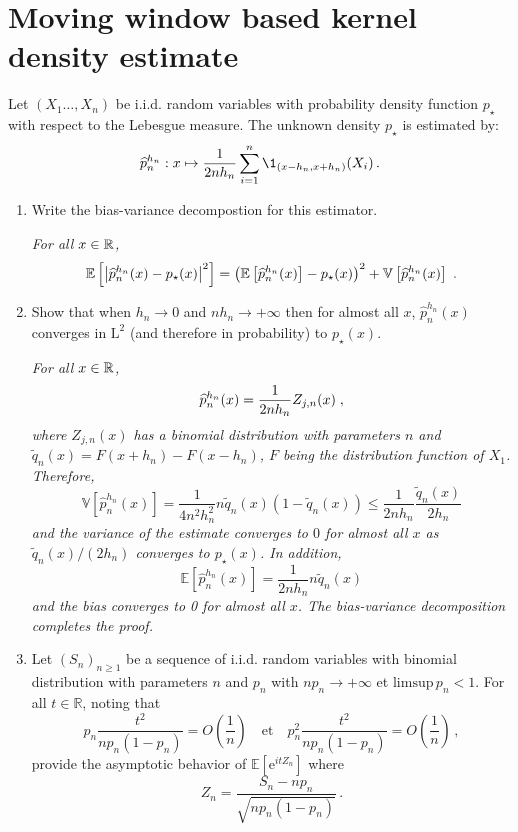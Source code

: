 \section{Moving window based kernel density estimate}
Let $(X_1\ldots,X_n)$ be i.i.d. random variables with probability density function $p_{\star}$ with respect to the Lebesgue measure. The unknown density  $p_{\star}$ is estimated by:
\[
\widehat{p}^{h_n}_n:x\mapsto \frac{1}{2nh_n}\sum_{i=1}^n \1_{(x-h_n,x+h_n)}(X_i)\,.
\]
\begin{enumerate}
\item Write the bias-variance decompostion for this estimator.

\vspace{.2cm}

{\em
For all $x\in\mathbb{R}$,
$$
\mathbb{E}\left[\left|\widehat{p}^{h_n}_n(x) - p_{\star}(x)\right|^2\right] = \left(\mathbb{E}\left[\widehat{p}^{h_n}_n(x)\right] - p_{\star}(x) \right)^2 + \mathbb{V}\left[\widehat{p}^{h_n}_n(x)\right] \;.
$$
}
\item Show that when  $h_n \to 0$ and $nh_n \to +\infty$ then for almost all $x$, $\widehat{p}^{h_n}_n(x)$ converges in $\mathrm{L}^2$ (and therefore in probability) to $p_{\star}(x)$.

\vspace{.2cm}

{\em
For all $x\in\mathbb{R}$,
$$
\widehat{p}^{h_n}_n(x) =  \frac{1}{2nh_n}Z_{j,n}(x)\;,
$$
where $Z_{j,n}(x)$ has a binomial distribution with parameters $n$ and $\tilde q_n(x) = F(x+h_n) - F(x-h_n)$, $F$ being the distribution function of $X_1$. Therefore,
$$
\mathbb{V}\left[\widehat{p}^{h_n}_n(x)\right]  = \frac{1}{4n^2h^2_n}n \tilde q_n(x) (1-\tilde q_n(x) ) \leqslant \frac{1}{2nh_n} \frac{\tilde q_n(x)}{2h_n} 
$$
and the variance of the estimate converges to $0$ for almost all $x$ as $\tilde q_n(x)/(2h_n)$ converges to $p_{\star}(x)$. In addition,
$$
\mathbb{E}\left[\widehat{p}^{h_n}_n(x)\right]  = \frac{1}{2nh_n} n\tilde q_n(x) 
$$
and the bias converges to 0 for almost all $x$. The bias-variance decomposition completes the proof.
}
\item Let $(S_n)_{n\geqslant 1}$ be a sequence of i.i.d. random variables with binomial distribution with parameters $n$ and $p_n$ with $n p_n \to +\infty$ et $\mathrm{limsup}\, p_n <1$. For all $t\in\mathbb{R}$, noting that 
\[
p_n\frac{t^2}{np_n(1-p_n)} = O\left(\frac{1}{n}\right) \quad\mbox{et}\quad p^2_n\frac{t^2}{np_n(1-p_n)} = O\left(\frac{1}{n}\right)\,,
\]
provide the asymptotic behavior of  $\mathbb{E}[\mathrm{e}^{itZ_n}]$ where
\[
Z_n = \frac{S_n-np_n}{\sqrt{np_n(1-p_n)}}\,.
\]


\end{enumerate}
